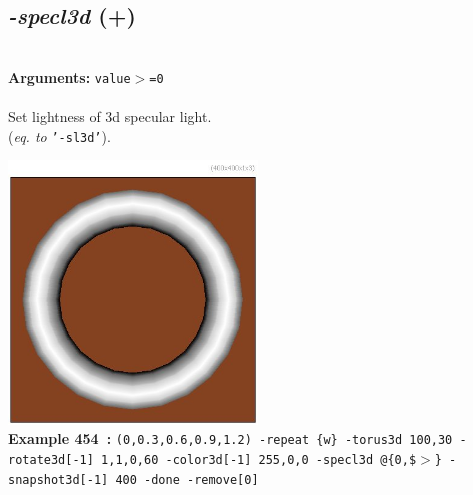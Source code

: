 \documentclass[a4paper,11pt,twoside]{book}
\begin{document}
\subsection{\emph{-specl3d} (+)}\vspace*{-0.5em}
~\\\textbf{Arguments: } 
{\small \texttt{value$>$=0}}\\~\\
Set lightness of 3d specular light.
~\\(\emph{eq. to} {\small \texttt{'-sl3d'}}).
\begin{center}\includegraphics[keepaspectratio=true,height=7cm,width=\textwidth]{img/gmic_def454.jpg}\\
{\footnotesize \textbf{Example 454~:} \texttt{(0,0.3,0.6,0.9,1.2) -repeat \{w\} -torus3d 100,30 -rotate3d[-1] 1,1,0,60 -color3d[-1] 255,0,0 -specl3d @\{0,\$$>$\} -snapshot3d[-1] 400 -done -remove[0]}}
\end{center}
\end{document}
